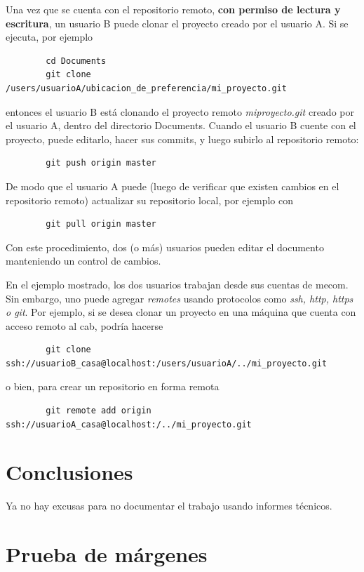 \documentclass[a4paper,11pt,twoside]{MECOM}
\begin{document}
    \par
    Una vez que se cuenta con el repositorio remoto, {\bf con permiso de lectura y escritura}, un usuario B puede clonar el proyecto creado por el usuario A. Si se ejecuta, por ejemplo
    \begin{verbatim}
        cd Documents
        git clone /users/usuarioA/ubicacion_de_preferencia/mi_proyecto.git
    \end{verbatim}
    entonces el usuario B est\'a clonando el proyecto remoto \emph{mi\textunderscore proyecto.git} creado por el usuario A, dentro del directorio Documents. Cuando el usuario B cuente con el proyecto, puede editarlo, hacer sus commits, y luego subirlo al repositorio remoto:
    \begin{verbatim}
        git push origin master
    \end{verbatim}
    De modo que el usuario A puede (luego de verificar que existen cambios en el repositorio remoto) actualizar su repositorio local, por ejemplo con
    \begin{verbatim}
        git pull origin master
    \end{verbatim}    

    \par
    Con este procedimiento, dos (o m\'as) usuarios pueden editar el documento manteniendo un control de cambios. 
    \par
    En el ejemplo mostrado, los dos usuarios trabajan desde sus cuentas de mecom. Sin embargo, uno puede agregar \emph{remotes} usando protocolos como \emph{ssh, http, https o git}. Por ejemplo, si se desea clonar un proyecto en una m\'aquina que cuenta con acceso remoto al cab, podr\'ia hacerse
    \begin{verbatim}
        git clone ssh://usuarioB_casa@localhost:/users/usuarioA/../mi_proyecto.git
    \end{verbatim}
    o bien, para crear un repositorio en forma remota
    \begin{verbatim}
        git remote add origin ssh://usuarioA_casa@localhost:/../mi_proyecto.git
    \end{verbatim}      
    
    
    
    
    
    
    \section{Conclusiones}
    Ya no hay excusas para no documentar el trabajo usando informes t\'ecnicos.\\    
    
    
    
    
    
    
    \newpage
    \section{Prueba de m\'argenes} \blindtext[11]    
\end{document}
